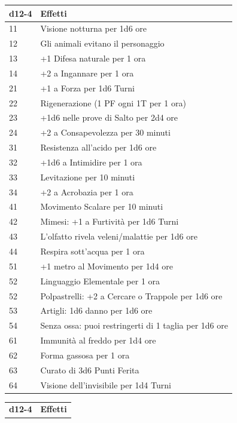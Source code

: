 \begin{multicols}{2}
\noindent\begin{tabularx}{\linewidth}{lX}
	\toprule
 \rowcolor{gray!20}\textbf{d12-4} & \textbf{Effetti}\\
	\toprule
11 & Visione notturna per 1d6 ore \\
\rowcolor{gray!20}12 & Gli animali evitano il personaggio \\
13 & +1 Difesa naturale per 1 ora \\
\rowcolor{gray!20}14 & +2 a Ingannare per 1 ora \\
21 & +1 a Forza per 1d6 Turni \\
\rowcolor{gray!20}22 & Rigenerazione (1 PF ogni 1T per 1 ora) \\
23 & +1d6 nelle prove di Salto per 2d4 ore\\
\rowcolor{gray!20}24 & +2 a Consapevolezza per 30 minuti \\
31 & Resistenza all'acido per 1d6 ore \\
\rowcolor{gray!20}32 & +1d6 a Intimidire per 1 ora \\
33 & Levitazione per 10 minuti \\
\rowcolor{gray!20}34 & +2 a Acrobazia per 1 ora \\
41 & Movimento Scalare per 10 minuti \\
\rowcolor{gray!20}42 & Mimesi: +1 a Furtività per 1d6 Turni\\
43 & L'olfatto rivela veleni/malattie per 1d6 ore \\
\rowcolor{gray!20}44 & Respira sott’acqua per 1 ora \\
51 & +1 metro al Movimento per 1d4 ore\\
\rowcolor{gray!20}52 & Linguaggio Elementale per 1 ora\\
52 & Polpastrelli: +2 a Cercare o Trappole per 1d6 ore\\
\rowcolor{gray!20}53 & Artigli: 1d6 danno per 1d6 ore\\
54 & Senza ossa: puoi restringerti di 1 taglia per 1d6 ore\\
61 & Immunità al freddo per 1d4 ore \\
\rowcolor{gray!20}62 & Forma gassosa per 1 ora\\
63 & Curato di 3d6 Punti Ferita\\
\rowcolor{gray!20}64 & Visione dell’invisibile per 1d4 Turni \\
\end{tabularx}
\noindent\begin{tabularx}{\linewidth}{lX}
\toprule
\rowcolor{gray!20}\textbf{d12-4} & \textbf{Effetti}\\

\end{tabularx}
\end{multicols}
